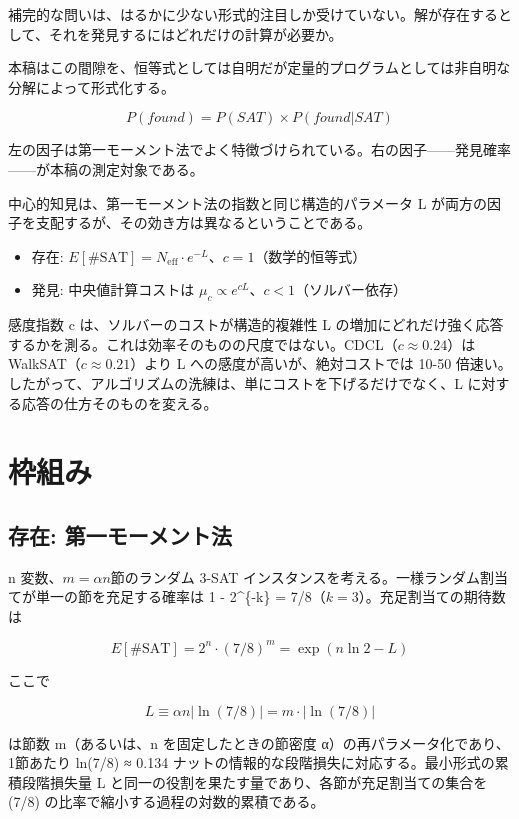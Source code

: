 \documentclass[12pt,a4paper]{article}
\begin{document}
補完的な問いは、はるかに少ない形式的注目しか受けていない。解が存在するとして、それを発見するにはどれだけの計算が必要か。

本稿はこの間隙を、恒等式としては自明だが定量的プログラムとしては非自明な分解によって形式化する。

\[
P(found) = P(SAT) \times P(found|SAT)
\]

左の因子は第一モーメント法でよく特徴づけられている。右の因子------発見確率------が本稿の測定対象である。

中心的知見は、第一モーメント法の指数と同じ構造的パラメータ L が両方の因子を支配するが、その効き方は異なるということである。

\begin{itemize}
\tightlist
\item
  存在: \(E[\#\text{SAT}] = N_{\text{eff}} \cdot e^{-L}\)、\(c = 1\)（数学的恒等式）
\item
  発見: 中央値計算コストは \(\mu_c \propto e^{cL}\)、\(c < 1\)（ソルバー依存）
\end{itemize}

感度指数 c は、ソルバーのコストが構造的複雑性 L の増加にどれだけ強く応答するかを測る。これは効率そのものの尺度ではない。CDCL（\(c ≈ 0.24\)）は WalkSAT（\(c ≈ 0.21\)）より L への感度が高いが、絶対コストでは 10-50 倍速い。したがって、アルゴリズムの洗練は、単にコストを下げるだけでなく、L に対する応答の仕方そのものを変える。

\section{枠組み}\label{ux67a0ux7d44ux307f}

\subsection{存在: 第一モーメント法}\label{ux5b58ux5728-ux7b2cux4e00ux30e2ux30fcux30e1ux30f3ux30c8ux6cd5}

n 変数、\(m = \alpha n\)節のランダム 3-SAT インスタンスを考える。一様ランダム割当てが単一の節を充足する確率は 1 - 2\^{}\{-k\} = 7/8（\(k = 3\)）。充足割当ての期待数は

\[
E[\#\text{SAT}] = 2^n \cdot (7/8)^m = \exp(n \ln 2 - L)
\]

ここで

\[
L ≡ \alpha n|\ln(7/8)| = m · |\ln(7/8)|
\]

は節数 m（あるいは、n を固定したときの節密度 α）の再パラメータ化であり、1節あたり \textbar ln(7/8)\textbar{} ≈ 0.134 ナットの情報的な段階損失に対応する。最小形式の累積段階損失量 L と同一の役割を果たす量であり、各節が充足割当ての集合を (7/8) の比率で縮小する過程の対数的累積である。
\end{document}
